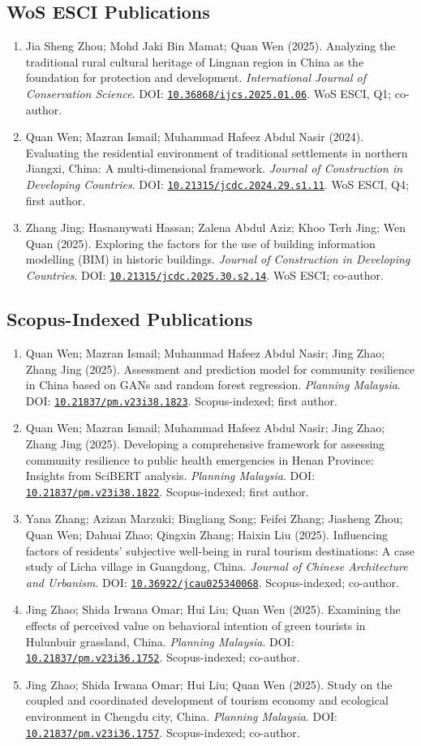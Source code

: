 \documentclass[11pt,a4paper]{article}
\newcommand{\doi}[1]{\href{https://doi.org/#1}{\nolinkurl{#1}}}
\newcommand{\pub}[6]{%
  \item #1 (#2). #3. \textit{#4}. DOI: \doi{#5}. #6%
}
\begin{document}
\subsection*{WoS ESCI Publications}
\begin{enumerate}
  \pub{Jia Sheng Zhou; Mohd Jaki Bin Mamat; Quan Wen}{2025}{Analyzing the traditional rural cultural heritage of Lingnan region in China as the foundation for protection and development}{International Journal of Conservation Science}{10.36868/ijcs.2025.01.06}{WoS ESCI, Q1; co-author.}
  \pub{Quan Wen; Mazran Ismail; Muhammad Hafeez Abdul Nasir}{2024}{Evaluating the residential environment of traditional settlements in northern Jiangxi, China: A multi-dimensional framework}{Journal of Construction in Developing Countries}{10.21315/jcdc.2024.29.s1.11}{WoS ESCI, Q4; first author.}
  \pub{Zhang Jing; Hasnanywati Hassan; Zalena Abdul Aziz; Khoo Terh Jing; Wen Quan}{2025}{Exploring the factors for the use of building information modelling (BIM) in historic buildings}{Journal of Construction in Developing Countries}{10.21315/jcdc.2025.30.s2.14}{WoS ESCI; co-author.}
\end{enumerate}

\subsection*{Scopus-Indexed Publications}
\begin{enumerate}
  \pub{Quan Wen; Mazran Ismail; Muhammad Hafeez Abdul Nasir; Jing Zhao; Zhang Jing}{2025}{Assessment and prediction model for community resilience in China based on GANs and random forest regression}{Planning Malaysia}{10.21837/pm.v23i38.1823}{Scopus-indexed; first author.}
  \pub{Quan Wen; Mazran Ismail; Muhammad Hafeez Abdul Nasir; Jing Zhao; Zhang Jing}{2025}{Developing a comprehensive framework for assessing community resilience to public health emergencies in Henan Province: Insights from SciBERT analysis}{Planning Malaysia}{10.21837/pm.v23i38.1822}{Scopus-indexed; first author.}
  \pub{Yana Zhang; Azizan Marzuki; Bingliang Song; Feifei Zhang; Jiasheng Zhou; Quan Wen; Dahuai Zhao; Qingxin Zhang; Haixin Liu}{2025}{Influencing factors of residents' subjective well-being in rural tourism destinations: A case study of Licha village in Guangdong, China}{Journal of Chinese Architecture and Urbanism}{10.36922/jcau025340068}{Scopus-indexed; co-author.}
  \pub{Jing Zhao; Shida Irwana Omar; Hui Liu; Quan Wen}{2025}{Examining the effects of perceived value on behavioral intention of green tourists in Hulunbuir grassland, China}{Planning Malaysia}{10.21837/pm.v23i36.1752}{Scopus-indexed; co-author.}
  \pub{Jing Zhao; Shida Irwana Omar; Hui Liu; Quan Wen}{2025}{Study on the coupled and coordinated development of tourism economy and ecological environment in Chengdu city, China}{Planning Malaysia}{10.21837/pm.v23i36.1757}{Scopus-indexed; co-author.}
\end{enumerate}
\end{document}
